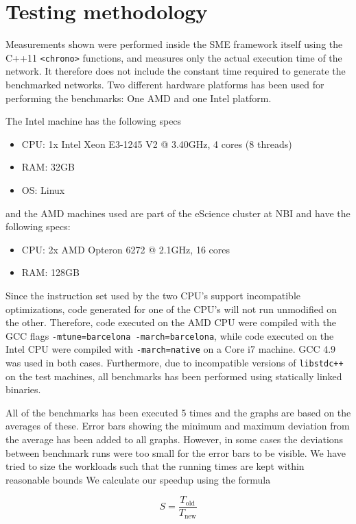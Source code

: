 \section{Testing methodology}
Measurements shown were performed inside the SME
framework itself using the C++11 \texttt{<chrono>} functions, and
measures only the actual execution time of the network. It therefore
does not include the constant time required to generate the
benchmarked networks. Two different hardware platforms has been used
for performing the benchmarks: One AMD and one Intel platform.

The Intel machine has the following specs
\begin{itemize}
\item CPU: 1x Intel Xeon E3-1245 V2 @ 3.40GHz, 4 cores (8 threads)
\item RAM: 32GB
\item OS: Linux
\end{itemize}

and the AMD machines used are part of the eScience cluster at NBI and
have the following specs:
\begin{itemize}
  \item CPU: 2x AMD Opteron 6272 @ 2.1GHz, 16 cores
  \item RAM: 128GB
\end{itemize}

Since the instruction set used by the two CPU's support incompatible
optimizations, code generated for one of the CPU's will not run
unmodified on the other. Therefore, code executed on the AMD CPU were
compiled with the GCC flags \texttt{-mtune=barcelona
  -march=barcelona}, while code executed on the Intel CPU were
compiled with \texttt{-march=native} on a Core i7 machine. GCC 4.9 was
used in both cases. Furthermore, due to incompatible versions of
\texttt{libstdc++} on the test machines, all benchmarks has been
performed using statically linked binaries.

All of the benchmarks has been executed 5 times and the graphs are
based on the averages of these. Error bars showing the minimum and
maximum deviation from the average has been added to all graphs.
However, in some cases the deviations between benchmark runs were too
small for the error bars to be visible.  We have tried to size the
workloads such that the running times are kept within reasonable
bounds We calculate our speedup using the formula


\begin{equation*}
S = \frac{T_{\text{old}}}{T_{\text{new}}}
\end{equation*}

